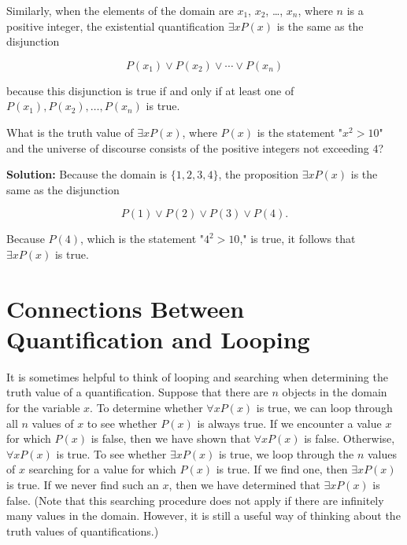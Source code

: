 \documentclass{Axon}
\begin{document}
Similarly, when the elements of the domain are \(x_1\), \(x_2\), \ldots, \(x_n\), where \(n\) is a positive integer, the existential quantification \(\exists x P(x)\) is the same as the disjunction

\begin{equation*}
    P(x_1) \lor P(x_2) \lor \cdots \lor P(x_n)
\end{equation*}

because this disjunction is true if and only if at least one of \(P(x_1), P(x_2) , \ldots, P(x_n)\) is true.

\begin{example}
    What is the truth value of \(\exists x P(x)\), where \(P(x)\) is the statement "\(x^2 > 10\)" and the universe of discourse consists of the positive integers not exceeding \(4\)?

    \noindent
    \textbf{Solution:}
    Because the domain is \(\{1, 2, 3, 4\}\), the proposition \(\exists x P(x)\) is the same as the disjunction

    \begin{equation*}
        P(1) \lor P(2) \lor P(3) \lor P(4).
    \end{equation*}

    Because \(P(4)\), which is the statement "\(4^2 > 10\)," is true, it follows that \(\exists x P(x)\) is true.
\end{example}

\section{Connections Between Quantification and Looping}
It is sometimes helpful to think of looping and searching when determining the truth value of a quantification. Suppose that there are \(n\) objects in the domain for the variable \(x\). To determine whether \(\forall x P(x)\) is true, we can loop through all \(n\) values of \(x\) to see whether \(P(x)\) is always true. If we encounter a value \(x\) for which \(P(x)\) is false, then we have shown that \(\forall x P(x)\) is false. Otherwise, \(\forall xP(x)\) is true. To see whether \(\exists x P(x)\) is true, we loop through the \(n\) values of \(x\) searching for a value for which \(P(x)\) is true. If we find one, then \(\exists x P(x)\) is true. If we never find such an \(x\), then we have determined that \(\exists x P(x)\) is false. (Note that this searching procedure does not apply if there are infinitely many values in the domain. However, it is still a useful way of thinking about the truth values of quantifications.)

\printbibliography
\end{document}
